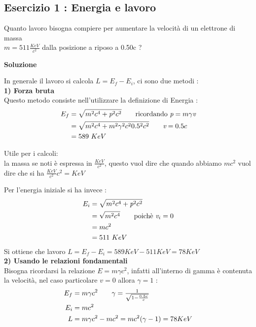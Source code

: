 \documentclass[a4paper, 12pt, twoside]{report}
\begin{document}
\subsection{Esercizio 1 : Energia e lavoro}
Quanto lavoro bisogna compiere per aumentare la velocità di un elettrone di massa \\ 
$m = 511 \frac{KeV}{c^2}$ dalla posizione a riposo a 0.50c ? 
\begin{center}{\textbf{Soluzione}}\end{center}
In generale il lavoro si calcola $ L = E_{f} - E_{i}$, ci sono due metodi :\\ 
\textbf{1) Forza bruta} \\
Questo metodo consiste nell'utilizzare la definizione di Energia : \\ 
\begin{align*}
        E_{f} &= \sqrt{m^2c^4 + \textit{p}^2c^2} \tag*{ricordando $\textit{p} = m\gamma\textit{v}$}\\ 
          &= \sqrt{m^2c^4 +m^2\gamma^2c^20.5^2c^2} \tag*{$\textit{v} = 0.5c$}\\
          &= 589 \ KeV
\end{align*}
\begin{tcolorbox}[colback=red!5!white,colframe=red!50!black,title=ATTENZIONE !]
Utile per i calcoli: \\
la massa se noti è espressa in $\frac{KeV}{c^2}$, questo vuol dire che quando abbiamo $mc^2$ 
vuol dire che si ha $\frac{KeV}{c^2}c^2 = KeV$
\end{tcolorbox}
Per l'energia iniziale si ha invece : \\
\begin{align*}
    E_{i} &= \sqrt{m^2c^4 + \textit{p}^2c^2} \\
          &= \sqrt{m^2c^4} \tag*{poichè $\textit{v}_{i} = 0$}\\
          &= mc^2 \\
          &= 511 \ KeV
\end{align*}
Si ottiene che lavoro $L = E_{f} - E_{i} = 589 KeV - 511 KeV = 78 KeV$ \\
\textbf{2) Usando le relazioni fondamentali}\\
Bisogna ricordarsi la relazione $E = m\gamma c^2$, infatti all'interno di gamma è contenuta la 
velocità, nel caso particolare $\textit{v} = 0$ allora $\gamma = 1$ : \\
\begin{align*}
        E_{f} &= m\gamma c^2 \tag*{$\gamma = \frac{1}{\sqrt{1-\frac{0.5c}{c}}}$}\\
        E_{i} &= mc^2\\
        L &= m\gamma c^2 - mc^2 = mc^2(\gamma - 1) = 78 KeV
\end{align*}
\end{document}
